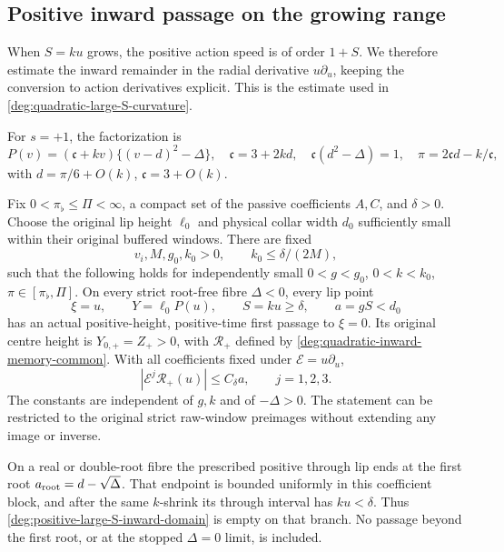 \subsection{Positive inward passage on the growing range}

When \(S=ku\) grows, the positive action speed is of order
\(1+S\). We therefore estimate the inward remainder in the radial
derivative \(u\partial_u\), keeping the conversion to action
derivatives explicit. This is the estimate used in
\eqref{deg:quadratic-large-S-curvature}.

For \(s=+1\), the factorization is
\[
 P(v)=(\mathfrak c+kv)\{(v-d)^2-\Delta\},\quad
 \mathfrak c=3+2kd,\quad \mathfrak c(d^2-\Delta)=1,\quad
 \pi=2\mathfrak cd-k/\mathfrak c,
\]
with \(d=\pi/6+O(k)\), \(\mathfrak c=3+O(k)\).

\begin{corollary}
\label{deg:cor-positive-large-S-inward}
Fix \(0<\pi_\flat\le\Pi<\infty\), a compact set of the passive
coefficients \(A,C\), and \(\delta>0\). Choose the original lip
height \(\ell_0\) and physical collar width \(d_0\) sufficiently small
within their original buffered windows. There are fixed
\[
 v_i,M,g_0,k_0>0,\qquad
 k_0\le\delta/(2M),
\]
such that the following holds for independently small
\(0<g<g_0\), \(0<k<k_0\), \(\pi\in[\pi_\flat,\Pi]\).
On every strict root-free fibre \(\Delta<0\), every lip point
\begin{equation}\label{deg:positive-large-S-inward-domain}
 \xi=u,\qquad Y=\ell_0P(u),\qquad
 S=ku\ge\delta,\qquad a=gS<d_0
\end{equation}
has an actual positive-height, positive-time first passage to \(\xi=0\).
Its original centre height is \(Y_{0,+}=Z_+>0\), with
\(\mathcal R_+\) defined by \eqref{deg:quadratic-inward-memory-common}.
With all coefficients fixed under \({\mathcal E}=u\partial_u\),
\begin{equation}\label{deg:positive-large-S-inward-action3}
 |{\mathcal E}^j\mathcal R_+(u)|\le C_\delta a,\qquad j=1,2,3 .
\end{equation}
The constants are independent of \(g,k\) and of \(-\Delta>0\).
The statement can be restricted to the original strict raw-window
preimages without extending any image or inverse.

On a real or double-root fibre the prescribed positive through lip ends
at the first root \(a_{\rm root}=d-\sqrt{\Delta}\). That endpoint is
bounded uniformly in this coefficient block, and after the same
\(k\)-shrink its through interval has \(ku<\delta\). Thus
\eqref{deg:positive-large-S-inward-domain} is empty on that branch. No passage beyond the first
root, or at the stopped \(\Delta=0\) limit, is included.
\end{corollary}

